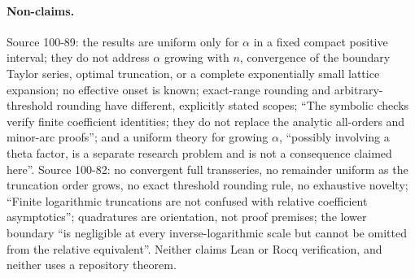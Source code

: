 \documentclass[11pt]{article}
\numberwithin{equation}{section}
\theoremstyle{definition}\newtheorem{definition}[theorem]{Definition}
\theoremstyle{remark}\newtheorem{remark}[theorem]{Remark}
\begin{document}
\paragraph{Non-claims.}
Source 100-89: the results are uniform only for $\alpha$ in a fixed compact
positive interval; they do not address $\alpha$ growing with $n$, convergence
of the boundary Taylor series, optimal truncation, or a complete exponentially
small lattice expansion; no effective onset is known; exact-range rounding and
arbitrary-threshold rounding have different, explicitly stated scopes; ``The
symbolic checks verify finite coefficient identities; they do not replace the
analytic all-orders and minor-arc proofs''; and a uniform theory for growing
$\alpha$, ``possibly involving a theta factor, is a separate research problem
and is not a consequence claimed here''.  Source 100-82: no convergent full
transseries, no remainder uniform as the truncation order grows, no exact
threshold rounding rule, no exhaustive novelty; ``Finite logarithmic
truncations are not confused with relative coefficient asymptotics'';
quadratures are orientation, not proof premises; the lower boundary ``is
negligible at every inverse-logarithmic scale but cannot be omitted from the
relative equivalent''.  Neither claims Lean or Rocq verification, and neither
uses a repository theorem.

\end{document}
